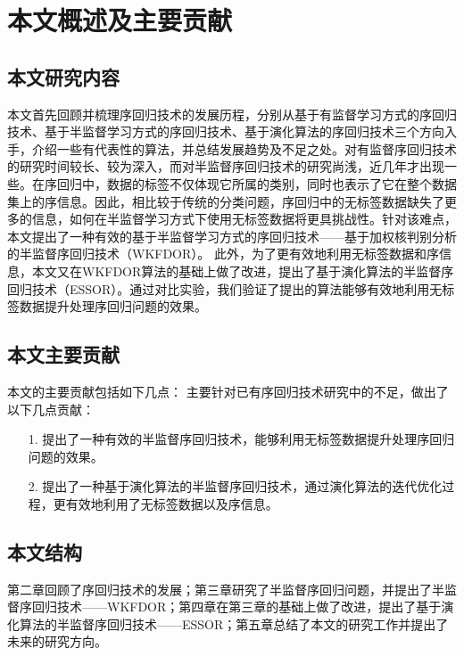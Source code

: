 

\section{本文概述及主要贡献}
\subsection{本文研究内容}
本文首先回顾并梳理序回归技术的发展历程，分别从基于有监督学习方式的序回归技术、基于半监督学习方式的序回归技术、基于演化算法的序回归技术三个方向入手，介绍一些有代表性的算法，并总结发展趋势及不足之处。对有监督序回归技术的研究时间较长、较为深入，而对半监督序回归技术的研究尚浅，近几年才出现一些。在序回归中，数据的标签不仅体现它所属的类别，同时也表示了它在整个数据集上的序信息。因此，相比较于传统的分类问题，序回归中的无标签数据缺失了更多的信息，如何在半监督学习方式下使用无标签数据将更具挑战性。针对该难点，本文提出了一种有效的基于半监督学习方式的序回归技术——基于加权核判别分析的半监督序回归技术（WKFDOR\citep{wu2015evolutionary}）。
此外，为了更有效地利用无标签数据和序信息，本文又在WKFDOR算法的基础上做了改进，提出了基于演化算法的半监督序回归技术（ESSOR\citep{wu2015evolutionary}）。通过对比实验，我们验证了提出的算法能够有效地利用无标签数据提升处理序回归问题的效果。

\subsection{本文主要贡献}
本文的主要贡献包括如下几点：
主要针对已有序回归技术研究中的不足，做出了以下几点贡献：
\begin{enumerate}
\item[1.]提出了一种有效的半监督序回归技术，能够利用无标签数据提升处理序回归问题的效果。
\item[2.]提出了一种基于演化算法的半监督序回归技术，通过演化算法的迭代优化过程，更有效地利用了无标签数据以及序信息。
\end{enumerate}

\subsection{本文结构}
第二章回顾了序回归技术的发展；第三章研究了半监督序回归问题，并提出了半监督序回归技术——WKFDOR；第四章在第三章的基础上做了改进，提出了基于演化算法的半监督序回归技术——ESSOR；第五章总结了本文的研究工作并提出了未来的研究方向。
